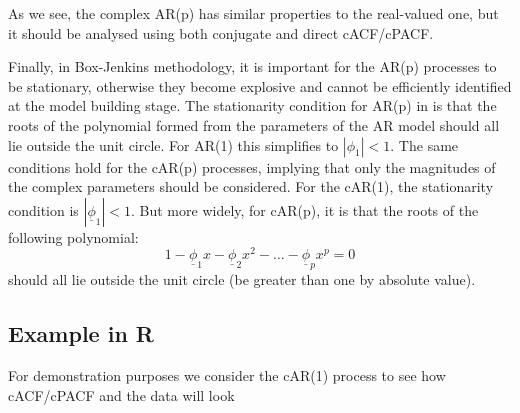 \documentclass[
]{book}
\begin{document}
As we see, the complex AR(p) has similar properties to the real-valued one, but it should be analysed using both conjugate and direct cACF/cPACF.

Finally, in Box-Jenkins methodology, it is important for the AR(p) processes to be stationary, otherwise they become explosive and cannot be efficiently identified at the model building stage. The stationarity condition for AR(p) in \citet{Box1976} is that the roots of the polynomial formed from the parameters of the AR model should all lie outside the unit circle. For AR(1) this simplifies to \(|\phi_1|<1\). The same conditions hold for the cAR(p) processes, implying that only the magnitudes of the complex parameters should be considered. For the cAR(1), the stationarity condition is \(|\underline{\phi}_1|<1\). But more widely, for cAR(p), it is that the roots of the following polynomial:
\begin{equation}
    1 - \underline{\phi}_1 x - \underline{\phi}_2 x^2 - \dots - \underline{\phi}_p x^p = 0
    \label{eq:ComplexARPolyRoots}
\end{equation}
should all lie outside the unit circle (be greater than one by absolute value).

\hypertarget{example-in-r-1}{%
\subsection{Example in R}\label{example-in-r-1}}

For demonstration purposes we consider the cAR(1) process to see how cACF/cPACF and the data will look
\end{document}
